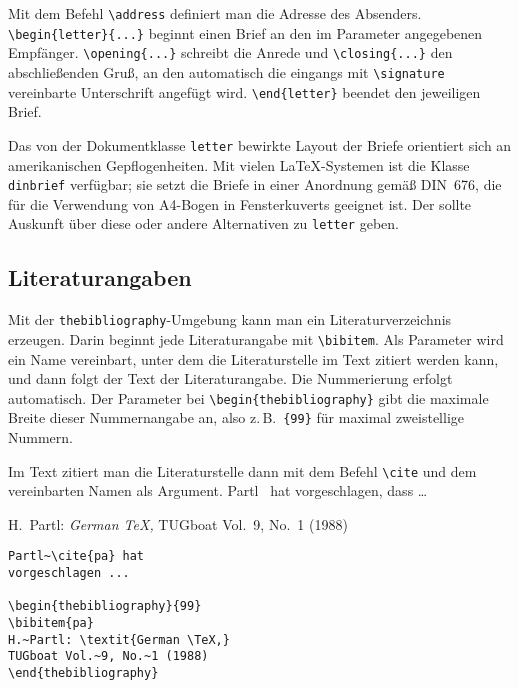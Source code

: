 Mit dem Befehl \verb|\address| definiert man die Adresse des Absenders.
\verb|\begin{letter}{...}| beginnt einen Brief an den im
Parameter angegebenen Empfänger.
\verb|\opening{...}| schreibt die Anrede 
und \verb|\closing{...}| den abschließenden Gruß, 
an den automatisch die eingangs mit
\verb|\signature| vereinbarte Unterschrift angefügt wird.
\verb|\end{letter}| beendet den jeweiligen Brief.

Das von der Dokumentklasse \texttt{letter} bewirkte Layout der Briefe 
orientiert sich an amerikanischen Gepflogenheiten.
Mit vielen \LaTeX-Systemen ist die Klasse 
\texttt{dinbrief} verfügbar; sie setzt die Briefe in einer
Anordnung gemäß DIN~676, 
die für die Verwendung von A4-Bogen in Fensterkuverts geeignet ist.
Der \local{} sollte Auskunft über diese oder andere Alternativen zu
\texttt{letter} geben.

\subsection{Literaturangaben}

Mit der \texttt{thebibliography}-Umgebung kann man ein
Literaturverzeichnis erzeugen.
Darin beginnt jede Literaturangabe mit \verb|\bibitem|.
Als Parameter wird ein Name vereinbart, unter dem die
Literaturstelle im Text zitiert werden kann, und
dann folgt der Text der Literaturangabe.
Die Nummerierung erfolgt automatisch.
Der Parameter bei \verb|\begin{thebibliography}| gibt die
maximale Breite dieser Nummernangabe an, also z.\,B.\ 
\verb|{99}| für maximal zweistellige Nummern.

Im Text zitiert man die Literaturstelle dann mit dem Befehl \verb|\cite|
und dem vereinbarten Namen als Argument.
\exa
Partl~\cite{pa} hat
vorgeschlagen, dass \dots
 
\begin{thebibliography}{99}
H.~Partl: \textit{German \TeX,}
TUG\-boat Vol.~9, No.~1 (1988)
\end{thebibliography}
\exb
\begin{verbatim}
Partl~\cite{pa} hat
vorgeschlagen ...
 
\begin{thebibliography}{99}
\bibitem{pa}
H.~Partl: \textit{German \TeX,}
TUGboat Vol.~9, No.~1 (1988)
\end{thebibliography}
\end{verbatim}
\exc

